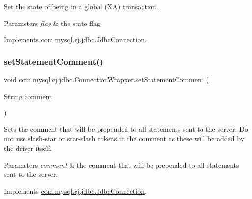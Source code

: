 Set the state of being in a global (XA) transaction.


\begin{DoxyParams}{Parameters}
{\em flag} & the state flag \\
\hline
\end{DoxyParams}


Implements \mbox{\hyperlink{interfacecom_1_1mysql_1_1cj_1_1jdbc_1_1_jdbc_connection_af7cff3ba67d2b787b04c3eff40f9e087}{com.\+mysql.\+cj.\+jdbc.\+Jdbc\+Connection}}.

\mbox{\label{classcom_1_1mysql_1_1cj_1_1jdbc_1_1_connection_wrapper_a79c9fe73cc7069028015a7e3e6a383fb}} 
\subsubsection{\texorpdfstring{set\+Statement\+Comment()}{setStatementComment()}}
{\footnotesize\ttfamily void com.\+mysql.\+cj.\+jdbc.\+Connection\+Wrapper.\+set\+Statement\+Comment (\begin{DoxyParamCaption}\item[{String}]{comment }\end{DoxyParamCaption})}

Sets the comment that will be prepended to all statements sent to the server. Do not use slash-\/star or star-\/slash tokens in the comment as these will be added by the driver itself.


\begin{DoxyParams}{Parameters}
{\em comment} & the comment that will be prepended to all statements sent to the server. \\
\hline
\end{DoxyParams}


Implements \mbox{\hyperlink{interfacecom_1_1mysql_1_1cj_1_1jdbc_1_1_jdbc_connection_adfbd59fbebd013673ed3eb97beb76179}{com.\+mysql.\+cj.\+jdbc.\+Jdbc\+Connection}}.

\mbox{\label{classcom_1_1mysql_1_1cj_1_1jdbc_1_1_connection_wrapper_a0989b3c99444046219ef68a1e15863c9}} 
